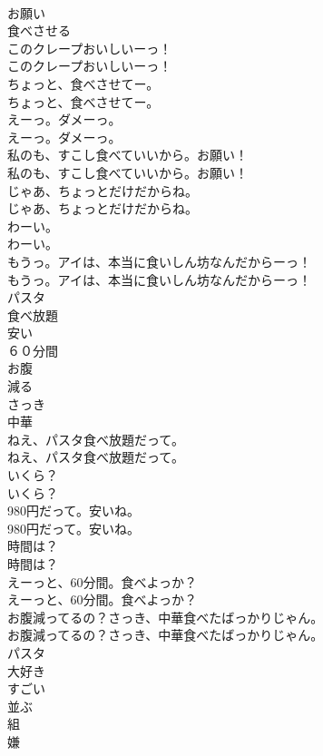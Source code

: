 \documentclass[8pt]{extreport}
\begin{document}
\begin{CJK}{UTF8}{min}
\\	お願い
\\	食べさせる
\\	このクレープおいしいーっ！	
\\	このクレープおいしいーっ！ 
\\	ちょっと、食べさせてー。	
\\	ちょっと、食べさせてー。 
\\	えーっ。ダメーっ。	
\\	えーっ。ダメーっ。 
\\	私のも、すこし食べていいから。お願い！	
\\	私のも、すこし食べていいから。お願い！ 
\\	じゃあ、ちょっとだけだからね。	
\\	じゃあ、ちょっとだけだからね。 
\\	わーい。	
\\	わーい。 
\\	もうっ。アイは、本当に食いしん坊なんだからーっ！	
\\	もうっ。アイは、本当に食いしん坊なんだからーっ！ 
\\	パスタ
\\	食べ放題
\\	安い
\\	６０分間
\\	お腹
\\	減る
\\	さっき
\\	中華
\\	ねえ、パスタ食べ放題だって。	
\\	ねえ、パスタ食べ放題だって。 
\\	いくら？	
\\	いくら？ 
\\	980円だって。安いね。	
\\	980円だって。安いね。 
\\	時間は？	
\\	時間は？ 
\\	えーっと、60分間。食べよっか？	
\\	えーっと、60分間。食べよっか？ 
\\	お腹減ってるの？さっき、中華食べたばっかりじゃん。	
\\	お腹減ってるの？さっき、中華食べたばっかりじゃん。 
\\	パスタ
\\	大好き
\\	すごい
\\	並ぶ
\\	組
\\	嫌

\end{CJK}
\end{document}
